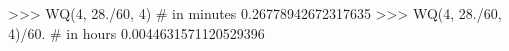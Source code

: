 
>>> WQ(4, 28./60, 4) # in minutes
0.26778942672317635
>>> WQ(4, 28./60, 4)/60. # in hours
0.0044631571120529396

